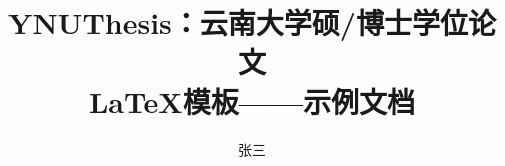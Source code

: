 \documentclass[type=Master, print=twoside]{style/YNU-thesis}
\title{YNUThesis：云南大学硕/博士学位论文\\ \LaTeX 模板——示例文档} %
\author{张三}
\begin{document}
	\makecover                             %
	\makereviewtable                       %
	\frontmatter                           %
	\tableofcontents                       %

	\mainmatter                     %


	
\end{document}
